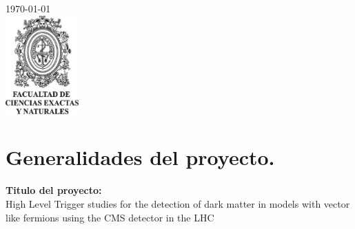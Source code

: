 \begin{titlepage}


{\large \today}\\[0.7cm] %


\includegraphics[width=2.8cm]{udea_fcen.jpg}\\[4cm] %
 

\vfill %

\end{titlepage}

\tableofcontents %

\cleardoublepage





\section{Generalidades del proyecto.}

\textbf{Titulo del proyecto:}\\
High Level Trigger studies for the detection of dark matter in models with vector like fermions using the CMS detector in the LHC
\\

